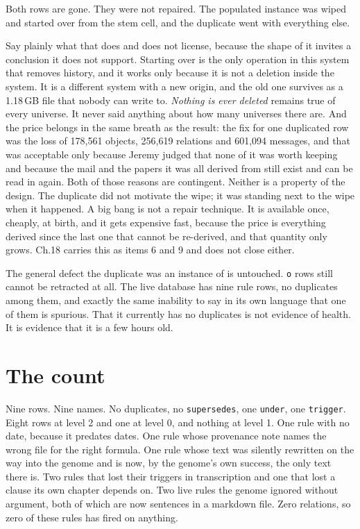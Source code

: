 Both rows are gone. They were not repaired. The populated instance was wiped and started over from the stem cell, and the duplicate went with everything else.

Say plainly what that does and does not license, because the shape of it invites a conclusion it does not support. Starting over is the only operation in this system that removes history, and it works only because it is not a deletion inside the system. It is a different system with a new origin, and the old one survives as a 1.18\,GB file that nobody can write to. \emph{Nothing is ever deleted} remains true of every universe. It never said anything about how many universes there are. And the price belongs in the same breath as the result: the fix for one duplicated row was the loss of 178,561 objects, 256,619 relations and 601,094 messages, and that was acceptable only because Jeremy judged that none of it was worth keeping and because the mail and the papers it was all derived from still exist and can be read in again. Both of those reasons are contingent. Neither is a property of the design. The duplicate did not motivate the wipe; it was standing next to the wipe when it happened. A big bang is not a repair technique. It is available once, cheaply, at birth, and it gets expensive fast, because the price is everything derived since the last one that cannot be re-derived, and that quantity only grows. Ch.18 carries this as items 6 and 9 and does not close either.

The general defect the duplicate was an instance of is untouched. \texttt{o} rows still cannot be retracted at all. The live database has nine rule rows, no duplicates among them, and exactly the same inability to say in its own language that one of them is spurious. That it currently has no duplicates is not evidence of health. It is evidence that it is a few hours old.

\section{The count}

Nine rows. Nine names. No duplicates, no \texttt{supersedes}, one \texttt{under}, one \texttt{trigger}. Eight rows at level 2 and one at level 0, and nothing at level 1. One rule with no date, because it predates dates. One rule whose provenance note names the wrong file for the right formula. One rule whose text was silently rewritten on the way into the genome and is now, by the genome's own success, the only text there is. Two rules that lost their triggers in transcription and one that lost a clause its own chapter depends on. Two live rules the genome ignored without argument, both of which are now sentences in a markdown file. Zero relations, so zero of these rules has fired on anything.


